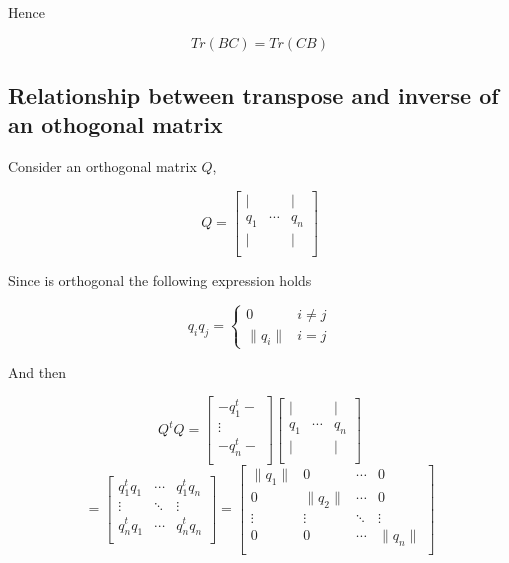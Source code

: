 \documentclass[12pt,journal]{IEEEtran}
\begin{document}
    Hence

    \begin{equation*}
        Tr(BC) = Tr(CB)
    \end{equation*}

    \subsection{Relationship between transpose and inverse of an othogonal matrix}
    \label{orthogonal}

    Consider an orthogonal matrix $Q$,

    \[
        Q =
        \begin{bmatrix}
             |  &        &  | \\
            q_1 & \cdots & q_n\\
             |  &        &  | \\
        \end{bmatrix}
    \]

    Since is orthogonal the following expression holds

    \[
        q_i q_j =
        \begin{cases}
           0 & i \neq j \\
           \lVert q_i \rVert & i = j
        \end{cases}
    \]

    And then

    \[
        Q^t Q =
        \begin{bmatrix}
             - q_1^t - \\
               \vdots  \\
             - q_n^t - \\
        \end{bmatrix}
        \begin{bmatrix}
             |  &        &  | \\
            q_1 & \cdots & q_n\\
             |  &        &  | \\
        \end{bmatrix}
    \]
    \[
        =
        \begin{bmatrix}
            q_1^t q_1 & \cdots & q_1^t q_n \\
              \vdots  & \ddots &  \vdots   \\
            q_n^t q_1 & \cdots & q_n^t q_n \\
        \end{bmatrix}
        =
        \begin{bmatrix}
          \lVert q_1 \rVert &         0         & \cdots &         0    \\
                  0         & \lVert q_2 \rVert & \cdots &         0    \\
               \vdots       &       \vdots      & \ddots &       \vdots \\
                  0         &         0         & \cdots & \lVert q_n \rVert \\
        \end{bmatrix}
    \]
\end{document}

